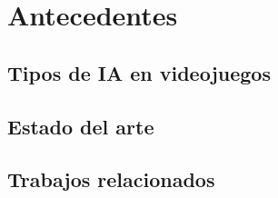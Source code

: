 \chapter{Antecedentes}


\section{Tipos de IA en videojuegos}


\section{Estado del arte}


\section{Trabajos relacionados}


